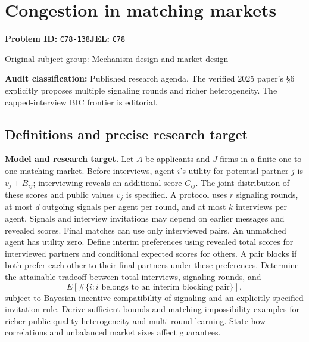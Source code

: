 \documentclass[11pt,a4paper]{article}
\begin{document}
\section*{Congestion in matching markets}
\textbf{Problem ID:} \texttt{C78-138}\quad \textbf{JEL:} \texttt{C78}\par
\label{problem:OP-0297}
{\sffamily\small\color{muted}Original subject group: Mechanism design and market design\par}
\label{definitions:problem:30007579}
\textbf{Audit classification:} Published research agenda. The verified 2025 paper’s §6 explicitly proposes multiple signaling rounds and richer heterogeneity. The capped-interview BIC frontier is editorial.
\subsection*{Definitions and precise research target}
\textbf{Model and research target.} Let \(A\) be applicants and \(J\) firms in a finite one-to-one matching market. Before interviews, agent \(i\)'s utility for potential partner \(j\) is \(v_j+B_{ij}\); interviewing reveals an additional score \(C_{ij}\). The joint distribution of these scores and public values \(v_j\) is specified. A protocol uses \(r\) signaling rounds, at most \(d\) outgoing signals per agent per round, and at most \(k\) interviews per agent. Signals and interview invitations may depend on earlier messages and revealed scores. Final matches can use only interviewed pairs. An unmatched agent has utility zero. Define interim preferences using revealed total scores for interviewed partners and conditional expected scores for others. A pair blocks if both prefer each other to their final partners under these preferences. Determine the attainable tradeoff between total interviews, signaling rounds, and
\[
 E[\#\{i:i\text{ belongs to an interim blocking pair}\}],
\]
subject to Bayesian incentive compatibility of signaling and an explicitly specified invitation rule. Derive sufficient bounds and matching impossibility examples for richer public-quality heterogeneity and multi-round learning. State how correlations and unbalanced market sizes affect guarantees.
\end{document}
